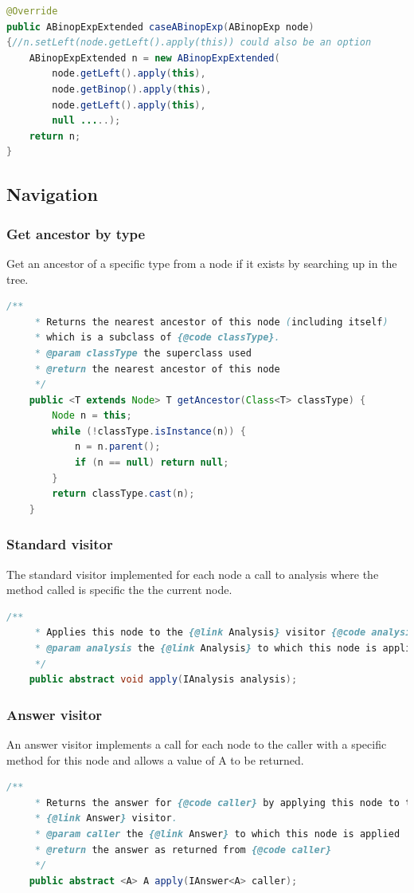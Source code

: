 \documentclass{overturerep}
\begin{document}
\begin{lstlisting}[language=java]
@Override
public ABinopExpExtended caseABinopExp(ABinopExp node)
{//n.setLeft(node.getLeft().apply(this)) could also be an option
	ABinopExpExtended n = new ABinopExpExtended(
		node.getLeft().apply(this), 
		node.getBinop().apply(this), 
		node.getLeft().apply(this), 
		null .....);
	return n;
}
\end{lstlisting}

\subsection{Navigation}

\subsubsection{Get ancestor by type}
Get an ancestor of a specific type from a node if it exists by searching up in the tree.
\begin{lstlisting}[language=java]
	/**
	 * Returns the nearest ancestor of this node (including itself)
	 * which is a subclass of {@code classType}.
	 * @param classType the superclass used
	 * @return the nearest ancestor of this node
	 */
	public <T extends Node> T getAncestor(Class<T> classType) {
		Node n = this;
		while (!classType.isInstance(n)) {
			n = n.parent();
			if (n == null) return null;
		}
		return classType.cast(n);
	}
\end{lstlisting}

\subsubsection{Standard visitor}
The standard visitor implemented for each node a call to analysis where the method called is specific the the current node.
\begin{lstlisting}[language=java]
	/**
	 * Applies this node to the {@link Analysis} visitor {@code analysis}.
	 * @param analysis the {@link Analysis} to which this node is applied
	 */
	public abstract void apply(IAnalysis analysis);
\end{lstlisting}

\subsubsection{Answer visitor}
An answer visitor implements a call for each node to the caller with a specific method for this node and allows a value of A to be returned.
\begin{lstlisting}[language=java]
	/**
	 * Returns the answer for {@code caller} by applying this node to the
	 * {@link Answer} visitor.
	 * @param caller the {@link Answer} to which this node is applied
	 * @return the answer as returned from {@code caller}
	 */
	public abstract <A> A apply(IAnswer<A> caller);
\end{lstlisting}
\end{document}
